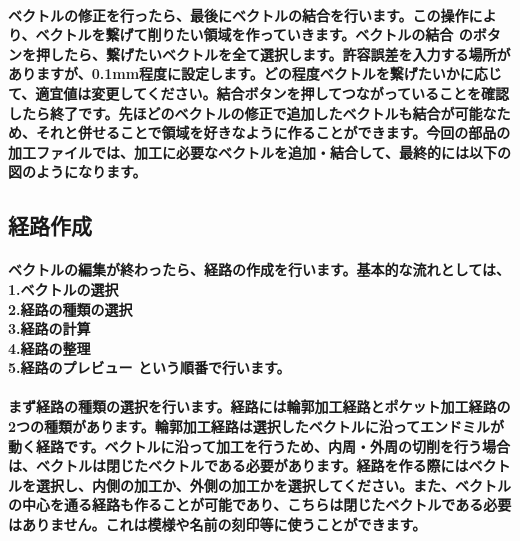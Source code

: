 \documentclass[b5paper, 9pt, twocolumn, titlepage,openany]{jsbook}%
\begin{document}

\paragraph{ベクトルの修正を行ったら、最後にベクトルの結合を行います。この操作により、ベクトルを繋げて削りたい領域を作っていきます。ベクトルの結合 のボタンを押したら、繋げたいベクトルを全て選択します。許容誤差を入力する場所がありますが、0.1mm程度に設定します。どの程度ベクトルを繋げたいかに応じて、適宜値は変更してください。結合ボタンを押してつながっていることを確認したら終了です。先ほどのベクトルの修正で追加したベクトルも結合が可能なため、それと併せることで領域を好きなように作ることができます。今回の部品の加工ファイルでは、加工に必要なベクトルを追加・結合して、最終的には以下の図のようになります。}


\subsection{経路作成}
\paragraph{ベクトルの編集が終わったら、経路の作成を行います。基本的な流れとしては、\\
  1.ベクトルの選択\\
  2.経路の種類の選択\\
  3.経路の計算\\
  4.経路の整理\\
  5.経路のプレビュー
  という順番で行います。}

\paragraph{まず経路の種類の選択を行います。経路には輪郭加工経路とポケット加工経路の2つの種類があります。輪郭加工経路は選択したベクトルに沿ってエンドミルが動く経路です。ベクトルに沿って加工を行うため、内周・外周の切削を行う場合は、ベクトルは閉じたベクトルである必要があります。経路を作る際にはベクトルを選択し、内側の加工か、外側の加工かを選択してください。また、ベクトルの中心を通る経路も作ることが可能であり、こちらは閉じたベクトルである必要はありません。これは模様や名前の刻印等に使うことができます。}

\end{document}
